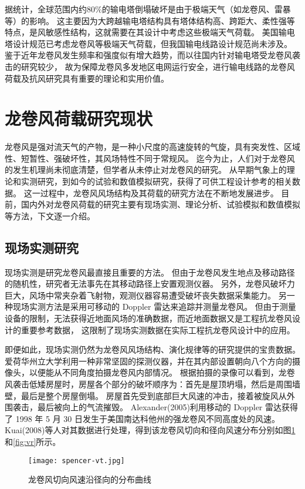 据统计，全球范围内约$80\%$的输电塔倒塌破坏是由于极端天气（如龙卷风、雷暴等）的影响\cite{hamada2010finite}。
这主要因为大跨越输电塔结构具有塔体结构高、跨距大、柔性强等特点，是风敏感性结构，这就需要在其设计中考虑这些极端天气荷载。
美国输电塔设计规范已考虑龙卷风等极端天气荷载，但我国输电线路设计规范尚未涉及。
鉴于近年龙卷风发生频率和强度似有增大趋势，而以往国内针对输电塔受龙卷风袭击的研究较少，
故为保障龙卷风多发地区电网运行安全，进行输电线路的龙卷风荷载及抗风研究具有重要的理论和实用价值。

\section{龙卷风荷载研究现状}
龙卷风是强对流天气的产物，是一种小尺度的高速旋转的气旋，具有突发性、区域性、短暂性、强破坏性，其风场特性不同于常规风。
迄今为止，人们对于龙卷风的发生机理尚未彻底清楚，但学者从未停止对龙卷风的研究。
从早期气象上的理论和实测研究，到如今的试验和数值模拟研究，获得了可供工程设计参考的相关数据。
这一过程中，龙卷风风场结构及其荷载的研究方法在不断地发展进步。
目前，国内外对龙卷风荷载的研究主要有现场实测、理论分析、试验模拟和数值模拟等方法，下文逐一介绍。

\subsection{现场实测研究}
现场实测是研究龙卷风最直接且重要的方法。
但由于龙卷风发生地点及移动路径的随机性，研究者无法事先在其移动路径上安置观测仪器。
另外，龙卷风破坏力巨大，风场中常夹杂着飞射物，观测仪器容易遭受破坏丧失数据采集能力。
另一种现场实测方法是采用可移动的 Doppler 雷达来追踪并测量龙卷风。
但由于测量设备的限制，无法获得近地面风场的准确数据，而近地面数据又是工程抗龙卷风设计的重要参考数据，
这限制了现场实测数据在实际工程抗龙卷风设计中的应用。

即便如此，现场实测仍然为龙卷风风场结构、演化规律等的研究提供的宝贵数据。
爱荷华州立大学利用一种非常坚固的探测仪器，并在其内部设置朝向八个方向的摄像头，以便能从不同角度拍摄龙卷风内部情况。
根据拍摄的录像可以看到，龙卷风袭击低矮房屋时，房屋各个部分的破坏顺序为：首先是屋顶坍塌，然后是周围墙壁，最后是整个房屋倒塌。
房屋首先受到底部巨大风速的冲击，接着被旋风从外围袭击，最后被向上的气流摧毁。
Alexander(2005)\cite{alexander200530}利用移动的 Doppler 雷达获得了 1998 年 5 月 30 日发生于美国南达科他州的强龙卷风不同高度处的风速。
Kuai(2008)\cite{kuai2008cfd}等人对其数据进行处理，得到该龙卷风切向和径向风速分布分别如图\ref{fig:vt}和\ref{fig:vr}所示。
\begin{figure}[!htbp]
    \centering
    \texttt{[image: spencer-vt.jpg]}
    \caption{龙卷风切向风速沿径向的分布曲线}
    \label{fig:vt}
\end{figure}

